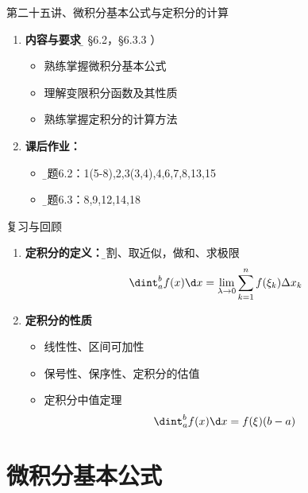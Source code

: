 \begin{frame}{第二十五讲、微积分基本公式与定积分的计算}
	\linespread{1.5}
	\begin{enumerate}
	  \item {\bf 内容与要求}{\b（ \S 6.2，\S 6.3.3 ）}
	  \begin{itemize}
	    \item 熟练掌握微积分基本公式
	    \item 理解变限积分函数及其性质
	    \item 熟练掌握定积分的计算方法
	  \vspace{1em}
	  \end{itemize}
	  \item {\bf 课后作业：}
	  \begin{itemize}
	    \item {\b 习题6.2：1(5-8),2,3(3,4),4,6,7,8,13,15}
	    \item {\b 习题6.3：8,9,12,14,18}
	  \end{itemize}
	\end{enumerate}
\end{frame}

\begin{frame}[<+->]{复习与回顾}
	\linespread{1.2}
	\begin{enumerate}
	  \item {\bf 定积分的定义：}{\b 分割、取近似，做和、求极限}
	  $$\dint_a^bf(x)\d x=\lim\limits_{\lambda\to
		0}\sum\limits_{k=1}^nf(\xi_k)\Delta x_k$$
	  \item {\bf 定积分的性质}
	  \begin{itemize}
	    \item 线性性、区间可加性
	    \item 保号性、保序性、定积分的估值
	    \item 定积分中值定理
	    $$\dint_a^bf(x)\d x=f(\xi)(b-a)$$
	  \end{itemize}
	\end{enumerate}
\end{frame}

\section{微积分基本公式}

